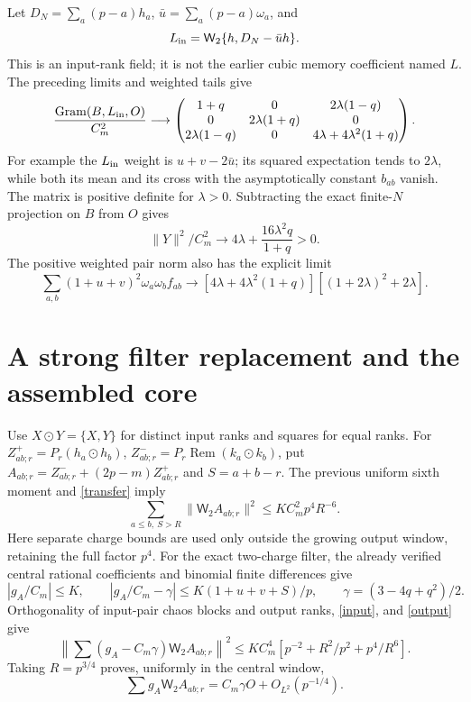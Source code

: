 \documentclass[11pt,a4paper]{article}
\newcommand{\Rem}{\operatorname{Rem}}
\newcommand{\W}{\mathsf W_2}
\begin{document}
Let $D_N=\sum_a(p-a)h_a$, $\bar u=\sum_a(p-a)\omega_a$, and
\begin{equation}
 L_{\rm in}=\W\{h,D_N-\bar u h\}.
\end{equation}
This is an input-rank field; it is not the earlier cubic memory
coefficient named $L$. The preceding limits and weighted tails give
\begin{equation}
 \frac{\operatorname{Gram}(B,L_{\rm in},O)}{C_m^2}
 \longrightarrow
 \begin{pmatrix}
 1+q&0&2\lambda(1-q)\\
 0&2\lambda(1+q)&0\\
 2\lambda(1-q)&0&4\lambda+4\lambda^2(1+q)
 \end{pmatrix}.\label{gram}
\end{equation}
For example the $L_{\rm in}$ weight is $u+v-2\bar u$;
its squared expectation tends to $2\lambda$, while both its
mean and its cross with the asymptotically constant $b_{ab}$ vanish.
The matrix is positive definite for $\lambda>0$. Subtracting
the exact finite-$N$ projection on $B$ from $O$ gives
\begin{equation}
 \|Y\|^2/C_m^2\longrightarrow
 4\lambda+\frac{16\lambda^2q}{1+q}>0.
\end{equation}
The positive weighted pair norm also has the explicit limit
\begin{equation}
 \sum_{a,b}(1+u+v)^2\omega_a\omega_b f_{ab}
 \longrightarrow[4\lambda+4\lambda^2(1+q)]
                  [(1+2\lambda)^2+2\lambda].
\end{equation}

\newpage
\section{A strong filter replacement and the assembled core}
Use $X\odot Y=\{X,Y\}$ for distinct input ranks and squares for equal ranks.
For $Z^+_{ab;r}=P_r(h_a\odot h_b)$,
$Z^-_{ab;r}=P_r\Rem(k_a\odot k_b)$, put
$A_{ab;r}=Z^-_{ab;r}+(2p-m)Z^+_{ab;r}$ and $S=a+b-r$.
The previous uniform sixth moment and \eqref{transfer} imply
\begin{equation}
 \sum_{a\le b,\ S>R}\|\W A_{ab;r}\|^2
 \le KC_m^2p^4R^{-6}.\label{output}
\end{equation}
Here separate charge bounds are used only outside the growing
output window, retaining the full factor $p^4$.
For the exact two-charge filter, the already verified central
rational coefficients and binomial finite differences give
\begin{equation}
 |g_A/C_m|\le K,\qquad
 |g_A/C_m-\gamma|\le K(1+u+v+S)/p,
 \qquad\gamma=(3-4q+q^2)/2.
\end{equation}
Orthogonality of input-pair chaos blocks and output ranks,
\eqref{input}, and \eqref{output} give
\begin{equation}
 \left\|\sum(g_A-C_m\gamma)\W A_{ab;r}\right\|^2
 \le KC_m^4[p^{-2}+R^2/p^2+p^4/R^6].
\end{equation}
Taking $R=p^{3/4}$ proves, uniformly in the central window,
\begin{equation}
 \boxed{\quad\sum g_A\W A_{ab;r}
       =C_m\gamma O+O_{L^2}(p^{-1/4}).\quad}\label{strong}
\end{equation}
\end{document}
